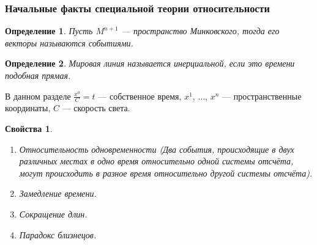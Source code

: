 \documentclass[12pt]{article}
\newcommand\tab[1][.5cm]{\hspace*{#1}}
\theoremstyle{plain}
\newtheorem{propertes}{Свойства}
\newtheorem{definition}{Определение}[section]
\begin{document}
    \subsubsection{Начальные факты специальной теории относительности}
    \begin{definition}
        Пусть $M^{n+1}$ --- пространство Минковского, тогда его векторы называются событиями.
    \end{definition}
    \begin{definition}
        Мировая линия называется инерциальной, если это времени подобная прямая.
    \end{definition}
    В данном разделе $\frac{x^0}{C}=t$ --- собственное время, $x^1$, $\ldots$, $x^n$ --- пространственные координаты, $C$ --- скорость света.
    \begin{propertes}\tab
        \begin{enumerate}
            \item Относительность одновременности (Два события, происходящие в двух различных местах в одно время относительно одной системы отсчёта, могут происходить в разное время относительно другой системы отсчёта).
            \item Замедление времени.
            \item Сокращение длин.
            \item Парадокс близнецов.
        \end{enumerate}
    \end{propertes}
\end{document}
